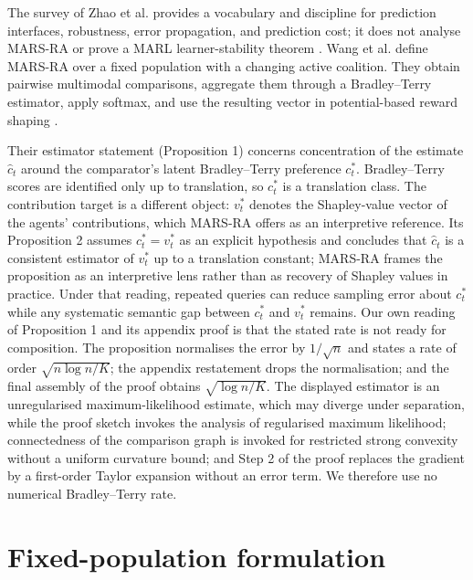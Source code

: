 \documentclass{article}
\begin{document}
The survey of Zhao et al. provides a vocabulary and discipline for prediction interfaces, robustness, error propagation, and prediction cost; it does not analyse MARS-RA or prove a MARL learner-stability theorem \cite{zhao2026learning}.
Wang et al. define MARS-RA over a fixed population with a changing active coalition. They obtain pairwise multimodal comparisons, aggregate them through a Bradley--Terry estimator, apply softmax, and use the resulting vector in potential-based reward shaping \cite{wang2026marsra}.

Their estimator statement (Proposition 1) concerns concentration of the estimate \(\widehat c_t\) around the comparator's latent Bradley--Terry preference \(c_t^*\). Bradley--Terry scores are identified only up to translation, so \(c_t^*\) is a translation class. The contribution target is a different object: \(v_t^*\) denotes the Shapley-value vector of the agents' contributions, which MARS-RA offers as an interpretive reference. Its Proposition 2 assumes \(c_t^*=v_t^*\) as an explicit hypothesis and concludes that \(\widehat c_t\) is a consistent estimator of \(v_t^*\) up to a translation constant; MARS-RA frames the proposition as an interpretive lens rather than as recovery of Shapley values in practice. Under that reading, repeated queries can reduce sampling error about \(c_t^*\) while any systematic semantic gap between \(c_t^*\) and \(v_t^*\) remains.
Our own reading of Proposition 1 and its appendix proof is that the stated rate is not ready for composition. The proposition normalises the error by \(1/\sqrt n\) and states a rate of order \(\sqrt{n\log n/K}\); the appendix restatement drops the normalisation; and the final assembly of the proof obtains \(\sqrt{\log n/K}\). The displayed estimator is an unregularised maximum-likelihood estimate, which may diverge under separation, while the proof sketch invokes the analysis of regularised maximum likelihood; connectedness of the comparison graph is invoked for restricted strong convexity without a uniform curvature bound; and Step 2 of the proof replaces the gradient by a first-order Taylor expansion without an error term. We therefore use no numerical Bradley--Terry rate.

\section{Fixed-population formulation}
\end{document}
